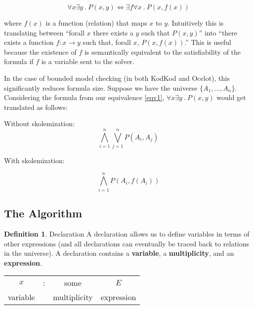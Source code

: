 \documentclass{article}
\theoremstyle{definition}
\newtheorem{definition}{Definition}[section]
\begin{document}
    \begin{equation} \label{eqv1}
        \forall x \exists y~.~P(x, y) \Leftrightarrow \exists f \forall x~.~P(x, f(x))
    \end{equation}

    where $f(x)$ is a function (relation) that maps $x$ to $y$. Intuitively this is translating between ``forall $x$ there exists a $y$ such that $P(x, y)$'' into ``there exists a function $f : x \rightarrow y$ such that, forall $x$, $P(x, f(x))$.'' This is useful because the existence of $f$ is semantically equivalent to the satisfiability of the formula if $f$ is a variable sent to the solver.

    In the case of bounded model checking (in both KodKod and Ocelot), this significantly reduces formula size. Suppose we have the universe $\{A_1, \dots, A_n\}$. Considering the formula from our equivalence \ref{eqv1}, $\forall x \exists y~.~P(x,y)$ would get translated as follows:

    Without skolemization:
    \begin{equation} \label{woskolem}
        \bigwedge_{i=1}^n\bigvee_{j=1}^n P(A_i, A_j)
    \end{equation}

    With skolemization:

    \begin{equation} \label{woskolem}
        \bigwedge_{i=1}^nP(A_i, f(A_i))
    \end{equation}

    \subsection{The Algorithm}

    \theoremstyle{definition}
    \begin{definition}{Declaration}
        A declaration allows us to define variables in terms of other expressions (and all declarations can eventually be traced back to relations in the universe). A declaration contains a \textbf{variable}, a \textbf{multiplicity}, and an \textbf{expression}.

        \begin{center}
            \begin{tabular}{c c c c}
                $x$ & : & some & $E$ \\
                variable & & multiplicity & expression
            \end{tabular}
        \end{center}
    \end{definition}
\end{document}
